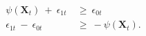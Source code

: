 \begin{equation}
\begin{split}
     \psi(\boldsymbol{X}_{t}) \ + \ \epsilon_{1t} \
     & \geq \ \epsilon_{0t} \\
     \epsilon_{1t} \ - \ \epsilon_{0t} \ 
     & \geq \ -\psi(\boldsymbol{X}_{t}).
\end{split}
\label{Equation:DCDP-Model_Decision-Rule}
\end{equation}